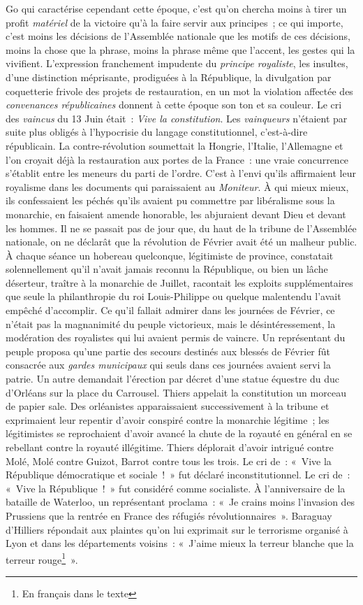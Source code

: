 \documentclass[french,twoside]{book} %
\begin{document}
Go qui caractérise cependant cette époque, c’est qu’on chercha moins à tirer un profit \emph{matériel} de la victoire qu’à la faire servir aux principes ; ce qui importe, c’est moins les décisions de l’Assemblée nationale que les motifs de ces décisions, moins la chose que la phrase, moins la phrase même que l’accent, les gestes qui la vivifient. L’expression franchement impudente du \emph{principe royaliste}, les insultes, d’une distinction méprisante, prodiguées à la République, la divulgation par coquetterie frivole des projets de restauration, en un mot la violation affectée des \emph{convenances républicaines} donnent à cette époque son ton et sa couleur. Le cri des \emph{vaincus} du 13 Juin était : \emph{Vive la constitution}. Les \emph{vainqueurs} n’étaient par suite plus obligés à l’hypocrisie du langage constitutionnel, c’est-à-dire républicain. La contre-révolution soumettait la Hongrie, l’Italie, l’Allemagne et l’on croyait déjà la restauration aux portes de la France : une vraie concurrence s’établit entre les meneurs du parti de l’ordre. C’est à l’envi qu’ils affirmaient leur royalisme dans les documents qui paraissaient au \emph{Moniteur}. À qui mieux mieux, ils confessaient les péchés qu’ils avaient pu commettre par libéralisme sous la monarchie, en faisaient amende honorable, les abjuraient devant Dieu et devant les hommes. Il ne se passait pas de jour que, du haut de la tribune de l’Assemblée nationale, on ne déclarât que la révolution de Février avait été un malheur public. À chaque séance un hobereau quelconque, légitimiste de province, constatait solennellement qu’il n’avait jamais reconnu la République, ou bien un lâche déserteur, traître à la monarchie de Juillet, racontait les exploits supplémentaires que seule la philanthropie du roi Louis-Philippe ou quelque malentendu l’avait empêché d’accomplir. Ce qu’il fallait admirer dans les journées de Février, ce n’était pas la magnanimité du peuple victorieux, mais le désintéressement, la modération des royalistes qui lui avaient permis de vaincre. Un représentant du peuple proposa qu’une partie des secours destinés aux blessés de Février fût consacrée aux \emph{gardes municipaux} qui seuls dans ces journées avaient servi la patrie. Un autre demandait l’érection par décret d’une statue équestre du duc d’Orléans sur la place du Carrousel. Thiers appelait la constitution un morceau de papier sale. Des orléanistes apparaissaient successivement à la tribune et exprimaient leur repentir d’avoir conspiré contre la monarchie légitime ; les légitimistes se reprochaient d’avoir avancé la chute de la royauté en général en se rebellant contre la royauté illégitime. Thiers déplorait d’avoir intrigué contre Molé, Molé contre Guizot, Barrot contre tous les trois. Le cri de : « Vive la République démocratique et sociale ! » fut déclaré inconstitutionnel. Le cri de : « Vive la République ! » fut considéré comme socialiste. À l’anniversaire de la bataille de Waterloo, un représentant proclama : « Je crains moins l’invasion des Prussiens que la rentrée en France des réfugiés révolutionnaires ». Baraguay d’Hilliers répondait aux plaintes qu’on lui exprimait sur le terrorisme organisé à Lyon et dans les départements voisins : « J’aime mieux la terreur blanche que la terreur rouge\footnote{En français dans le texte} ». 
\end{document}
